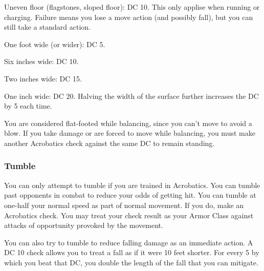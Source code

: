 \begin{itemize*}
  \item Uneven floor (flagstones, sloped floor): DC 10. This only applise when running or charging. Failure means you lose a move action (and possibly fall), but you can still take a standard action.
  \item One foot wide (or wider): DC 5. 
  \item Six inches wide: DC 10.
  \item Two inches wide: DC 15.
  \item One inch wide: DC 20. Halving the width of the surface further increases the DC by 5 each time.
\end{itemize*}

 You are considered flat-footed while balancing, since you can't move to avoid a blow. If you take damage or are forced to move while balancing, you must make another Acrobatics check against the same DC to remain standing.

\subsubsection{Tumble}
You can only attempt to tumble if you are trained in Acrobatics.
 You can tumble past opponents in combat to reduce your odds of getting hit. You can tumble at one-half your normal speed as part of normal movement. If you do, make an Acrobatics check. You may treat your check result as your Armor Class against attacks of opportunity provoked by the movement.

You can also try to tumble to reduce falling damage as an immediate action. A DC 10 check allows you to treat a fall as if it were 10 feet shorter. For every 5 by which you beat that DC, you double the length of the fall that you can mitigate.


